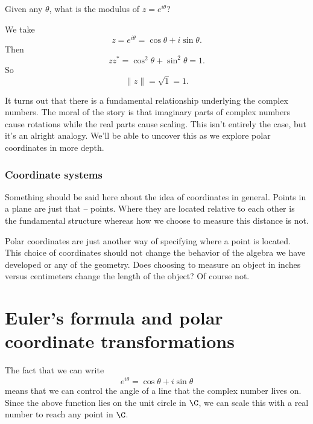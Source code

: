         \begin{question}
                Given any $\theta$, what is the modulus of $z=e^{i\theta}$?
        \end{question}
        
        \begin{answer}
        We take
        \[
        z=e^{i\theta}=\cos \theta + i \sin \theta.
        \]
        Then
        \[
        zz^*=\cos^2 \theta + \sin^2 \theta = 1.
        \]
        So
        \[
        \|z\|=\sqrt{1}=1.
        \]
        \end{answer}
        
        It turns out that there is a fundamental relationship underlying the complex numbers.  The moral of the story is that imaginary parts of complex numbers cause rotations while the real parts cause scaling. This isn't entirely the case, but it's an alright analogy. We'll be able to uncover this as we explore polar coordinates in more depth.
        
        \subsubsection{Coordinate systems}
        \begin{remark}
        Something should be said here about the idea of coordinates in general.  Points in a plane are just that -- points.  Where they are located relative to each other is the fundamental structure whereas how we choose to measure this distance is not.  
        
        Polar coordinates are just another way of specifying where a point is located.  This choice of coordinates should not change the behavior of the algebra we have developed or any of the geometry.  Does choosing to measure an object in inches versus centimeters change the length of the object? Of course not.
        \end{remark}
        
        \section{Euler's formula and polar coordinate transformations}
        The fact that we can write
        \[
        e^{i\theta}= \cos \theta + i \sin \theta
        \]
        means that we can control the angle of a line that the complex number lives on.  Since the above function lies on the unit circle in $\C$, we can scale this with a real number to reach any point in $\C$. 
        
